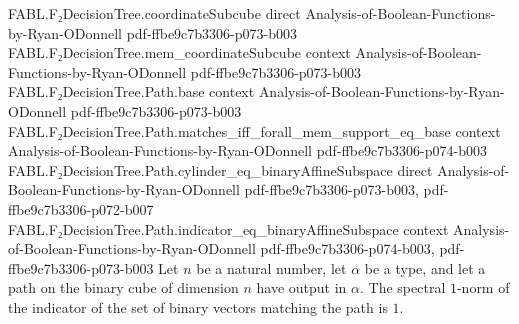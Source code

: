 \begin{theorem}
\proofstep
  {FABL.F₂DecisionTree.coordinateSubcube}
  {direct}
  {Analysis-of-Boolean-Functions-by-Ryan-ODonnell}
  {pdf-ffbe9c7b3306-p073-b003}
\proofstep
  {FABL.F₂DecisionTree.mem_coordinateSubcube}
  {context}
  {Analysis-of-Boolean-Functions-by-Ryan-ODonnell}
  {pdf-ffbe9c7b3306-p073-b003}
\proofstep
  {FABL.F₂DecisionTree.Path.base}
  {context}
  {Analysis-of-Boolean-Functions-by-Ryan-ODonnell}
  {pdf-ffbe9c7b3306-p073-b003}
\proofstep
  {FABL.F₂DecisionTree.Path.matches_iff_forall_mem_support_eq_base}
  {context}
  {Analysis-of-Boolean-Functions-by-Ryan-ODonnell}
  {pdf-ffbe9c7b3306-p074-b003}
\proofstep
  {FABL.F₂DecisionTree.Path.cylinder_eq_binaryAffineSubspace}
  {direct}
  {Analysis-of-Boolean-Functions-by-Ryan-ODonnell}
  {pdf-ffbe9c7b3306-p073-b003,
    pdf-ffbe9c7b3306-p072-b007}
\proofstep
  {FABL.F₂DecisionTree.Path.indicator_eq_binaryAffineSubspace}
  {context}
  {Analysis-of-Boolean-Functions-by-Ryan-ODonnell}
  {pdf-ffbe9c7b3306-p074-b003,
    pdf-ffbe9c7b3306-p073-b003}
Let $n$ be a natural number, let $\alpha$ be a type, and let a path on the binary cube
of dimension $n$ have output in $\alpha$. The spectral $1$-norm of the indicator of the
set of binary vectors matching the path is $1$.
\end{theorem}

